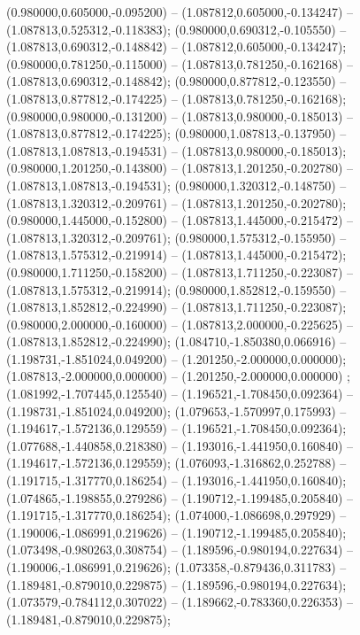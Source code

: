  (0.980000,0.605000,-0.095200) -- (1.087812,0.605000,-0.134247) -- (1.087813,0.525312,-0.118383);
 (0.980000,0.690312,-0.105550) -- (1.087813,0.690312,-0.148842) -- (1.087812,0.605000,-0.134247);
 (0.980000,0.781250,-0.115000) -- (1.087813,0.781250,-0.162168) -- (1.087813,0.690312,-0.148842);
 (0.980000,0.877812,-0.123550) -- (1.087813,0.877812,-0.174225) -- (1.087813,0.781250,-0.162168);
 (0.980000,0.980000,-0.131200) -- (1.087813,0.980000,-0.185013) -- (1.087813,0.877812,-0.174225);
 (0.980000,1.087813,-0.137950) -- (1.087813,1.087813,-0.194531) -- (1.087813,0.980000,-0.185013);
 (0.980000,1.201250,-0.143800) -- (1.087813,1.201250,-0.202780) -- (1.087813,1.087813,-0.194531);
 (0.980000,1.320312,-0.148750) -- (1.087813,1.320312,-0.209761) -- (1.087813,1.201250,-0.202780);
 (0.980000,1.445000,-0.152800) -- (1.087813,1.445000,-0.215472) -- (1.087813,1.320312,-0.209761);
 (0.980000,1.575312,-0.155950) -- (1.087813,1.575312,-0.219914) -- (1.087813,1.445000,-0.215472);
 (0.980000,1.711250,-0.158200) -- (1.087813,1.711250,-0.223087) -- (1.087813,1.575312,-0.219914);
 (0.980000,1.852812,-0.159550) -- (1.087813,1.852812,-0.224990) -- (1.087813,1.711250,-0.223087);
 (0.980000,2.000000,-0.160000) -- (1.087813,2.000000,-0.225625) -- (1.087813,1.852812,-0.224990);
 (1.084710,-1.850380,0.066916) -- (1.198731,-1.851024,0.049200) -- (1.201250,-2.000000,0.000000);
 (1.087813,-2.000000,0.000000) -- (1.201250,-2.000000,0.000000) ;
 (1.081992,-1.707445,0.125540) -- (1.196521,-1.708450,0.092364) -- (1.198731,-1.851024,0.049200);
 (1.079653,-1.570997,0.175993) -- (1.194617,-1.572136,0.129559) -- (1.196521,-1.708450,0.092364);
 (1.077688,-1.440858,0.218380) -- (1.193016,-1.441950,0.160840) -- (1.194617,-1.572136,0.129559);
 (1.076093,-1.316862,0.252788) -- (1.191715,-1.317770,0.186254) -- (1.193016,-1.441950,0.160840);
 (1.074865,-1.198855,0.279286) -- (1.190712,-1.199485,0.205840) -- (1.191715,-1.317770,0.186254);
 (1.074000,-1.086698,0.297929) -- (1.190006,-1.086991,0.219626) -- (1.190712,-1.199485,0.205840);
 (1.073498,-0.980263,0.308754) -- (1.189596,-0.980194,0.227634) -- (1.190006,-1.086991,0.219626);
 (1.073358,-0.879436,0.311783) -- (1.189481,-0.879010,0.229875) -- (1.189596,-0.980194,0.227634);
 (1.073579,-0.784112,0.307022) -- (1.189662,-0.783360,0.226353) -- (1.189481,-0.879010,0.229875);
